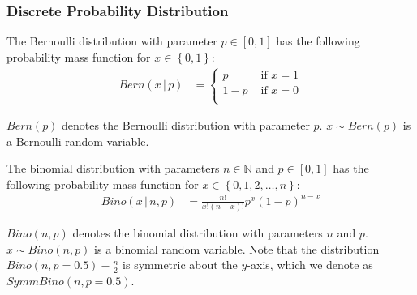 \subsubsection{Discrete Probability Distribution}
\label{subsubsec:DiscreteProbabilityDistribution}

\begin{definition}
    \label{def:BernoulliDistribution}
    The Bernoulli distribution with parameter $p \in \left[0,1\right] $ has the following probability mass function for $x\in \left\{0,1\right\}  $:
    \begin{equation}
        \begin{split}
            Bern\left(x \,|\,p \right)&=
            \begin{cases}
                p   & \text{ if } x =1 \\
                1-p & \text{ if } x =0 \\
            \end{cases}
        \end{split}
    \end{equation}
\end{definition}
$Bern\left(p \right)$ denotes the Bernoulli distribution with parameter $p  $.
$x \sim Bern\left( p \right)$ is a Bernoulli random variable.


\begin{definition}
    \label{def:BinomialDistribution}
    The binomial distribution with parameters $n \in \mathbb{N} $ and $p \in \left[0,1\right] $ has the following probability mass function for $x \in \left\{0,1,2, \ldots ,n\right\} $:
    \begin{equation}
        \begin{split}
            Bino\left( x \,|\,n,p \right)&=\frac{n!}{x!\left(n-x\right)! }p^x\left(1-p\right) ^{n-x}
        \end{split}
    \end{equation}
\end{definition}
$Bino\left(n,p \right)$ denotes the binomial distribution with parameters $n  $ and $p  $.
$x \sim Bino\left( n,p \right)$ is a binomial random variable. Note that the distribution $Bino\left(n,p=0.5 \right)-\frac{n}{2}$ is symmetric about the $y$-axis, which we denote as $SymmBino\left(n,p=0.5 \right)$.


